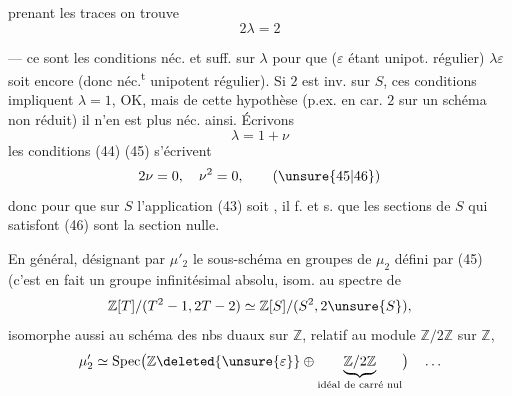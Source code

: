 prenant les traces on trouve
\[
  2\lambda=2 \tag{45}
\]

--- ce sont les conditions néc. et suff. sur $\lambda$ pour que
\deleted{\unsure{$\lambda$}}
($\varepsilon$ étant unipot. régulier)
$\lambda\varepsilon$ soit encore 
 (donc néc.\textsuperscript{t} unipotent régulier).
Si $2$ est inv. sur $S$, 
ces conditions impliquent $\lambda=1$, OK, mais
 de cette hypothèse (p.ex. en car. $2$
 sur un schéma non réduit) il n'en est plus néc. ainsi. Écrivons
\[
  \lambda=1+\nu
\]
les conditions (44) (45) s'écrivent
\[
  2\nu=0,\quad \nu^2=0, \tag{\unsure{45|46}}
\]
donc pour que sur $S$ l'application (43) soit , il f. et s.
que les  sections de $S$ qui satisfont (46)
sont la section nulle.

En général, désignant par $\mu'_2$ le sous-schéma
en groupes de $\mu_2$ défini par (45)
(c'est en fait un  groupe infinitésimal absolu,
 
isom. au spectre de
\[
  \mathbb Z[T]/(T^2-1,2T-2)\simeq
  \mathbb Z[S]/(S^2,2\unsure{S}),
\]
isomorphe aussi au schéma des nbs duaux sur $\mathbb Z$,
relatif au module $\mathbb Z/2\mathbb Z$ sur $\mathbb Z$,
\[
  \mu'_2\simeq\operatorname{Spec}
  \bigl(\mathbb Z\deleted{\unsure{\varepsilon}}\oplus\underbrace{\mathbb Z/2\mathbb Z}_{\text{idéal de carré nul}}\bigr)
  \quad\ldots
\]


